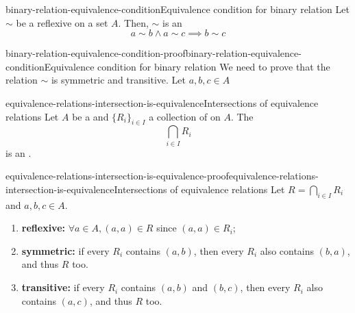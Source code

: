 \documentclass[preview]{standalone}
\begin{document}
\begin{snippetproposition}{binary-relation-equivalence-condition}{Equivalence condition for binary relation}
    Let \(\sim\) be a reflexive \binrelation on a set \(A\).
    Then, \(\sim\) is an \equivrelation \ifandonlyif
    \[ a\sim b \land a \sim c \implies b \sim c \]
\end{snippetproposition}

\begin{snippetproof}{binary-relation-equivalence-condition-proof}{binary-relation-equivalence-condition}{Equivalence condition for binary relation}
    We need to prove that the relation \(\sim\) is symmetric and transitive.
    Let \(a,b,c\in A\) \\
\end{snippetproof}

\begin{snippetproposition}{equivalence-relations-intersection-is-equivalence}{Intersections of equivalence relations}
    Let \(A\) be a \set and \(\{R_i\}_{i\in I}\) a collection of  on \(A\).
    The \binrelation
    \[ \bigcap_{i\in I} R_i \]
    is an \equivrelation.
\end{snippetproposition}

\begin{snippetproof}{equivalence-relations-intersection-is-equivalence-proof}{equivalence-relations-intersection-is-equivalence}{Intersections of equivalence relations}
    Let \( R=\bigcap_{i\in I} R_i \) and \(a,b,c\in A\).
    \begin{enumerate}
        \item \textbf{reflexive:} \(\forall a \in A, (a,a) \in R\) since \((a,a) \in R_i\);
        \item \textbf{symmetric:} if every \(R_i\) contains \((a,b)\), then every \(R_i\) also contains \((b,a)\),
            and thus \(R\) too. 
        \item \textbf{transitive:} if every \(R_i\) contains \((a,b)\) and \((b,c)\), then every \(R_i\)
            also contains \((a,c)\), and thus \(R\) too.
    \end{enumerate}
\end{snippetproof}
\end{document}
